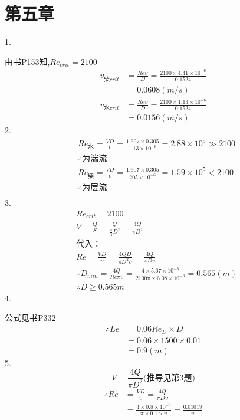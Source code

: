 \documentclass[a4paper,fleqn,twocolumn]{article}
\begin{document}
\section*{第五章}
    1.\par
        由书P153知,$Re_{crit}=2100$
        \begin{align*}
            v_{柴crit}  &=\frac{Re\upsilon}{D}=\frac{2100\times4.41\times10^{-6}}{0.1524}\\
                        &=0.0608\left(m/s\right)\\
            v_{水crit}  &=\frac{Re\upsilon}{D}=\frac{2100\times1.13\times10^{-6}}{0.1524}\\
                        &=0.0156\left(m/s\right)
        \end{align*}
    2.
        \begin{align*}
            &Re_水=\frac{VD}{\upsilon}=\frac{1.607\times0.305}{1.13\times10^{-6}}=2.88\times10^5\gg2100\\
            &\therefore\text{为湍流}\\
            &Re_柴=\frac{VD}{\upsilon}=\frac{1.607\times0.305}{205\times10^{-6}}=1.59\times10^5<2100\\
            &\therefore\text{为层流}\\
        \end{align*}
    3.
        \begin{align*}
            &Re_{crit}=2100\\
            &V=\frac{Q}{S}=\frac{Q}{\frac{\pi}{4}D^2}=\frac{4Q}{\pi D^2}\\
            &\text{代入：}\\
            &Re=\frac{VD}{\upsilon}=\frac{4QD}{\pi D^2\upsilon}=\frac{4Q}{\pi D\upsilon}\\
            &\therefore D_{min}=\frac{4Q}{Re\pi\upsilon}=\frac{4\times5.67\times10^{-3}}{2100\pi\times6.08\times10^{-6}}=0.565(m)\\
            &\therefore D\geqslant 0.565m
        \end{align*}
    4.\par
        公式见书P332
        \begin{align*}
            \therefore Le  &=0.06Re_D\times D\\
                            &=0.06\times1500\times0.01\\
                            &=0.9(m)
        \end{align*}
    5.
        \[V=\frac{4Q}{\pi D^2}\text{(推导见第3题)}\]
        \begin{align*}
            \therefore Re  &=\frac{VD}{\upsilon}=\frac{4Q}{\pi D\upsilon}\\
                            &=\frac{4\times0.8\times10^{-3}}{\pi\times0.1\times\upsilon}=\frac{0.01019}{\upsilon}
        \end{align*}
\end{document}
